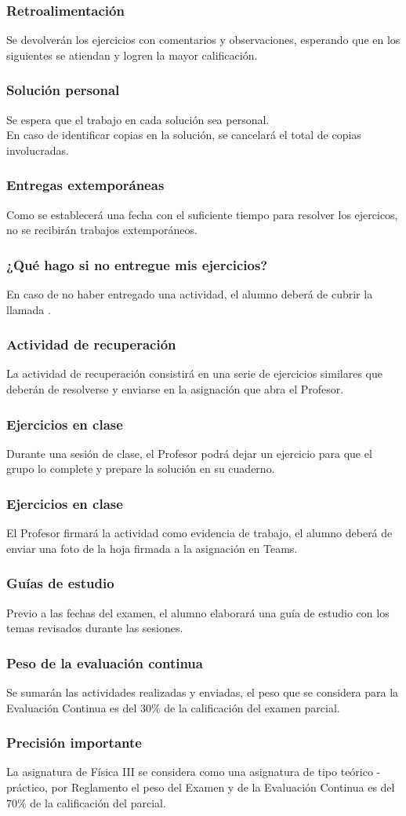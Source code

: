 \documentclass[14pt]{beamer}
\begin{document}
\begin{frame}
\frametitle{Retroalimentación}
Se devolverán los ejercicios con comentarios y observaciones, esperando que en los siguientes se atiendan y logren la mayor calificación.
\end{frame}
\begin{frame}
\frametitle{Solución personal}
Se espera que el trabajo en cada solución sea personal.
\\
\bigskip
\pause
En caso de identificar copias en la solución, se cancelará el total de copias involucradas.
\end{frame}
\begin{frame}
\frametitle{Entregas extemporáneas}
Como se establecerá una fecha con el suficiente tiempo para resolver los ejercicos, no se recibirán trabajos extemporáneos.
\end{frame}
\begin{frame}
\frametitle{¿Qué hago si no entregue mis ejercicios?}
En caso de no haber entregado una actividad, el alumno deberá de cubrir la llamada .
\end{frame}
\begin{frame}
\frametitle{Actividad de recuperación}
La actividad de recuperación consistirá en una serie de ejercicios similares que deberán de resolverse y enviarse en la asignación que abra el Profesor.
\end{frame}
\begin{frame}
\frametitle{Ejercicios en clase}
Durante una sesión de clase, el Profesor podrá dejar un ejercicio para que el grupo lo complete y prepare la solución en su cuaderno.
\end{frame}
\begin{frame}
\frametitle{Ejercicios en clase}
El Profesor firmará la actividad como evidencia de trabajo, \pause el alumno deberá de enviar una foto de la hoja firmada a la asignación en Teams.
\end{frame}
\begin{frame}
\frametitle{Guías de estudio}
Previo a las fechas del examen, el alumno elaborará una guía de estudio con los temas revisados durante las sesiones.
\end{frame}
\begin{frame}
\frametitle{Peso de la evaluación continua}
Se sumarán las actividades realizadas y enviadas, el peso que se considera para la Evaluación Continua es del $30\%$ de la calificación del examen parcial.
\end{frame}
\begin{frame}
\frametitle{Precisión importante}
La asignatura de Física III se considera como una asignatura de tipo teórico - práctico, \pause por Reglamento el peso del Examen y de la Evaluación Continua es del $70\%$ de la calificación del parcial.
\end{frame}
\end{document}
